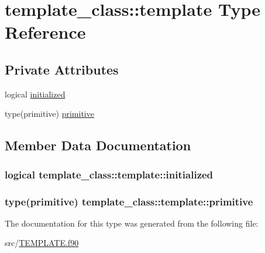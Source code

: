 \hypertarget{structtemplate__class_1_1template}{\section{template\-\_\-class\-:\-:template Type Reference}
\label{structtemplate__class_1_1template}
}
\subsection*{Private Attributes}
\begin{DoxyCompactItemize}
\item 
logical \hyperlink{structtemplate__class_1_1template_a298960ed9ac90b343825931d41da48a2}{initialized}
\item 
type(primitive) \hyperlink{structtemplate__class_1_1template_ae6f2d52744f8eddc4cff4eae9d8b366c}{primitive}
\end{DoxyCompactItemize}


\subsection{Member Data Documentation}
\hypertarget{structtemplate__class_1_1template_a298960ed9ac90b343825931d41da48a2}{
\subsubsection[{initialized}]{\setlength{\rightskip}{0pt plus 5cm}logical template\-\_\-class\-::template\-::initialized\hspace{0.3cm}{\ttfamily [private]}}}\label{structtemplate__class_1_1template_a298960ed9ac90b343825931d41da48a2}
\hypertarget{structtemplate__class_1_1template_ae6f2d52744f8eddc4cff4eae9d8b366c}{
\subsubsection[{primitive}]{\setlength{\rightskip}{0pt plus 5cm}type(primitive) template\-\_\-class\-::template\-::primitive\hspace{0.3cm}{\ttfamily [private]}}}\label{structtemplate__class_1_1template_ae6f2d52744f8eddc4cff4eae9d8b366c}


The documentation for this type was generated from the following file\-:\begin{DoxyCompactItemize}
\item 
src/\hyperlink{_t_e_m_p_l_a_t_e_8f90}{T\-E\-M\-P\-L\-A\-T\-E.\-f90}\end{DoxyCompactItemize}

